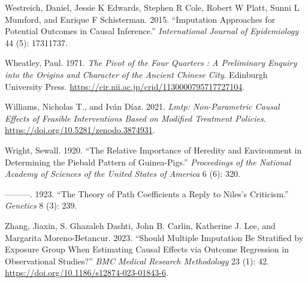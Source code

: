 \documentclass[
  singlecolumn]{article}
\newlength{\cslhangindent}
\newlength{\cslentryspacingunit} %
\newenvironment{CSLReferences}[2] %
 {%
  \setlength{\parindent}{0pt}
  \ifodd #1
  \let\oldpar\par
  \def\par{\hangindent=\cslhangindent\oldpar}
  \fi
  \setlength{\parskip}{#2\cslentryspacingunit}
 }%
 {}
\begin{document}
\begin{CSLReferences}{1}{0}
\leavevmode{}%
Westreich, Daniel, Jessie K Edwards, Stephen R Cole, Robert W Platt,
Sunni L Mumford, and Enrique F Schisterman. 2015. {``Imputation
Approaches for Potential Outcomes in Causal Inference.''}
\emph{International Journal of Epidemiology} 44 (5): 17311737.

\leavevmode{}%
Wheatley, Paul. 1971. \emph{The Pivot of the Four Quarters : A
Preliminary Enquiry into the Origins and Character of the Ancient
Chinese City}. Edinburgh University Press.
\url{https://cir.nii.ac.jp/crid/1130000795717727104}.

\leavevmode{}%
Williams, Nicholas T., and Iván Díaz. 2021. \emph{Lmtp: Non-Parametric
Causal Effects of Feasible Interventions Based on Modified Treatment
Policies}. \url{https://doi.org/10.5281/zenodo.3874931}.

\leavevmode{}%
Wright, Sewall. 1920. {``The Relative Importance of Heredity and
Environment in Determining the Piebald Pattern of Guinea-Pigs.''}
\emph{Proceedings of the National Academy of Sciences of the United
States of America} 6 (6): 320.

\leavevmode{}%
---------. 1923. {``The Theory of Path Coefficients a Reply to Niles's
Criticism.''} \emph{Genetics} 8 (3): 239.

\leavevmode{}%
Zhang, Jiaxin, S. Ghazaleh Dashti, John B. Carlin, Katherine J. Lee, and
Margarita Moreno-Betancur. 2023. {``Should Multiple Imputation Be
Stratified by Exposure Group When Estimating Causal Effects via Outcome
Regression in Observational Studies?''} \emph{BMC Medical Research
Methodology} 23 (1): 42.
\url{https://doi.org/10.1186/s12874-023-01843-6}.

\end{CSLReferences}
\end{document}
